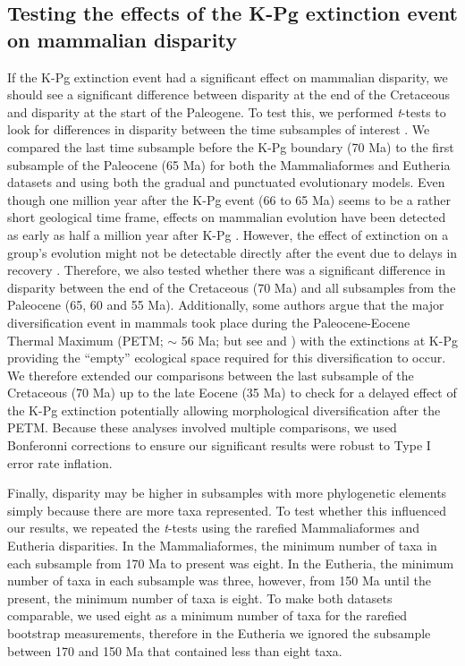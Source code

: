 \documentclass[10pt,letterpaper]{article}
\begin{document}
\subsection{Testing the effects of the K-Pg extinction event on mammalian disparity}
If the K-Pg extinction event had a significant effect on mammalian disparity, we should see a significant difference between disparity at the end of the Cretaceous and disparity at the start of the Paleogene.
To test this, we performed \textit{t}-tests to look for differences in disparity between the time subsamples of interest \citep[e.g. as used in][]{anderson2012using,zelditch2012geometric,smith2014joined}.
We compared the last time subsample before the K-Pg boundary (70 Ma) to the first subsample of the Paleocene (65 Ma) for both the Mammaliaformes and Eutheria datasets and using both the gradual and punctuated evolutionary models.
Even though one million year after the K-Pg event (66 to 65 Ma) seems to be a rather short geological time frame, effects on mammalian evolution have been detected as early as half a million year after K-Pg \citep{Wilson2013}.
However, the effect of extinction on a group's evolution might not be detectable directly after the event due to delays in recovery \citep[e.g.][estimated that ecosystems only fully recovered 8-9 Ma after the Permo-Triassic mass extinction]{chen2012timing}.
Therefore, we also tested whether there was a significant difference in disparity between the end of the Cretaceous (70 Ma) and all subsamples from the Paleocene (65, 60 and 55 Ma).
Additionally, some authors argue that the major diversification event in mammals took place during the Paleocene-Eocene Thermal Maximum (PETM; $\sim$ 56 Ma; \citealt{bininda2007delayed} but see \citealt{meredithimpacts2011} and \citealt{Stadler12042011}) with the extinctions at K-Pg providing the ``empty'' ecological space required for this diversification to occur.
We therefore extended our comparisons between the last subsample of the Cretaceous (70 Ma) up to the late Eocene (35 Ma) to check for a delayed effect of the K-Pg extinction potentially allowing morphological diversification after the PETM. 
Because these analyses involved multiple comparisons, we used Bonferonni corrections \citep{holm1979simple} to ensure our significant results were robust to Type I error rate inflation. 

Finally, disparity may be higher in subsamples with more phylogenetic elements simply because there are more taxa represented.
To test whether this influenced our results, we repeated the \textit{t}-tests using the rarefied Mammaliaformes and Eutheria disparities.
In the Mammaliaformes, the minimum number of taxa in each subsample from 170 Ma to present was eight.
In the Eutheria, the minimum number of taxa in each subsample was three, however, from 150 Ma until the present, the minimum number of taxa is eight.
To make both datasets comparable, we used eight as a minimum number of taxa for the rarefied bootstrap measurements, therefore in the Eutheria we ignored the subsample between 170 and 150 Ma that contained less than eight taxa.
\end{document}
